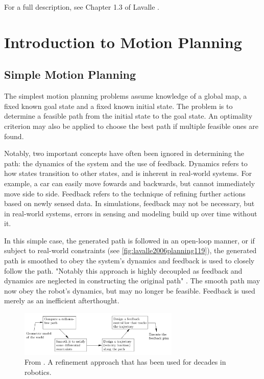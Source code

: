 For a full description, see Chapter 1.3 of Lavalle \cite{lavalle2006planning}.
\section{Introduction to Motion Planning}
\subsection{Simple Motion Planning}
The simplest motion planning problems assume knowledge of a global map, a fixed
known goal state and a fixed known initial state. The problem is to determine a
feasible path from the initial state to the goal state. An optimality criterion
may also be applied to choose the best path if multiple feasible ones are found.

Notably, two important concepts have often been ignored in determining the path:
the dynamics of the system and the use of feedback. Dynamics refers to how
states transition to other states, and is inherent in real-world systems. For
example, a car can easily move fowards and backwards, but cannot immediately
move side to side. Feedback refers to the technique of refining further actions
based on newly sensed data. In simulations, feedback may not be necessary, but
in real-world systems, errors in sensing and modeling build up over time without
it.

In this simple case, the generated path is followed in an open-loop manner, or
if subject to real-world constraints (see \autoref{fig:lavalle2006planning119}),
the generated path is smoothed to obey the system's dynamics and feedback is
used to closely follow the path. "Notably this approach is highly decoupled as
feedback and dynamics are neglected in constructing the original path"
\cite{lavalle2006planning}. The smooth path may now obey the robot's dynamics,
but may no longer be feasible.  Feedback is used merely as an inefficient
afterthought.

\begin{figure}
\centering
\includegraphics[width=3in]{figures/lavalle2006planning119.png}
\caption{From \cite{lavalle2006planning}. A refinement approach that has been used for decades in robotics.}
\label{fig:lavalle2006planning119}
\end{figure}


